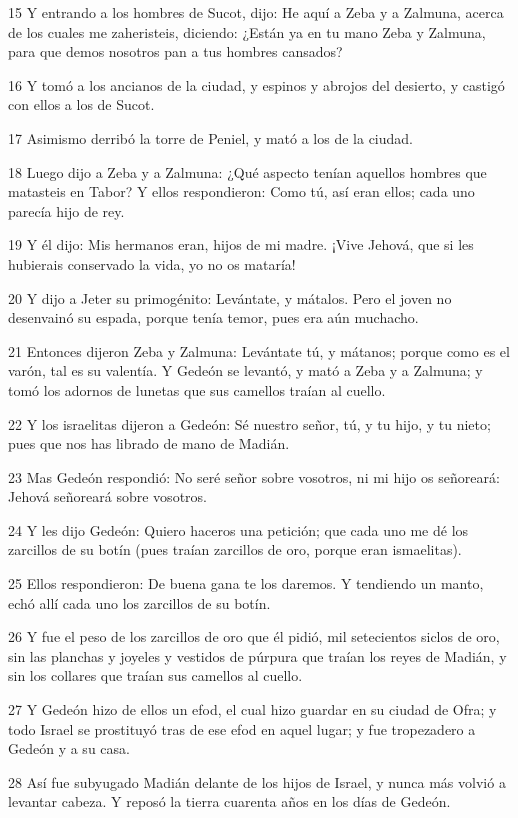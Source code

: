 \par 15 Y entrando a los hombres de Sucot, dijo: He aquí a Zeba y a Zalmuna, acerca de los cuales me zaheristeis, diciendo: ¿Están ya en tu mano Zeba y Zalmuna, para que demos nosotros pan a tus hombres cansados?
\par 16 Y tomó a los ancianos de la ciudad, y espinos y abrojos del desierto, y castigó con ellos a los de Sucot.
\par 17 Asimismo derribó la torre de Peniel, y mató a los de la ciudad.
\par 18 Luego dijo a Zeba y a Zalmuna: ¿Qué aspecto tenían aquellos hombres que matasteis en Tabor? Y ellos respondieron: Como tú, así eran ellos; cada uno parecía hijo de rey.
\par 19 Y él dijo: Mis hermanos eran, hijos de mi madre. ¡Vive Jehová, que si les hubierais conservado la vida, yo no os mataría!
\par 20 Y dijo a Jeter su primogénito: Levántate, y mátalos. Pero el joven no desenvainó su espada, porque tenía temor, pues era aún muchacho.
\par 21 Entonces dijeron Zeba y Zalmuna: Levántate tú, y mátanos; porque como es el varón, tal es su valentía. Y Gedeón se levantó, y mató a Zeba y a Zalmuna; y tomó los adornos de lunetas que sus camellos traían al cuello.
\par 22 Y los israelitas dijeron a Gedeón: Sé nuestro señor, tú, y tu hijo, y tu nieto; pues que nos has librado de mano de Madián.
\par 23 Mas Gedeón respondió: No seré señor sobre vosotros, ni mi hijo os señoreará: Jehová señoreará sobre vosotros.
\par 24 Y les dijo Gedeón: Quiero haceros una petición; que cada uno me dé los zarcillos de su botín (pues traían zarcillos de oro, porque eran ismaelitas).
\par 25 Ellos respondieron: De buena gana te los daremos. Y tendiendo un manto, echó allí cada uno los zarcillos de su botín.
\par 26 Y fue el peso de los zarcillos de oro que él pidió, mil setecientos siclos de oro,  sin las planchas y joyeles y vestidos de púrpura que traían los reyes de Madián, y sin los collares que traían sus camellos al cuello.
\par 27 Y Gedeón hizo de ellos un efod, el cual hizo guardar en su ciudad de Ofra; y todo Israel se prostituyó tras de ese efod en aquel lugar; y fue tropezadero a Gedeón y a su casa.
\par 28 Así fue subyugado Madián delante de los hijos de Israel, y nunca más volvió a levantar cabeza. Y reposó la tierra cuarenta años en los días de Gedeón.
